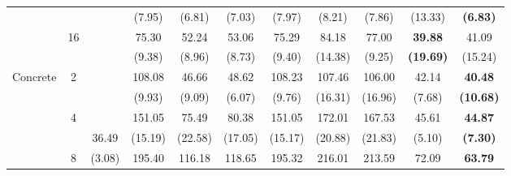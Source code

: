 \documentclass[letterpaper]{article} %
\begin{document}
\begin{table}[!t]
{\begin{tabular}{clcccccccc|cc}
\multicolumn{2}{c}{}                             &                       &                             & (7.95)                    & (6.81)                    & (7.03)                      & (7.97)                    & (8.21)                    & (7.86)                      & (13.33)             & \textbf{(6.83)}       \\
\multicolumn{2}{c}{}                             & \multirow{2}{*}{16}   &                             & 75.30                     & 52.24                     & 53.06                       & 75.29                     & 84.18                     & 77.00                       & \textbf{39.88}      & 41.09                 \\
\multicolumn{2}{c}{}                             &                       &                             & (9.38)                    & (8.96)                    & (8.73)                      & (9.40)                    & (14.38)                   & (9.25)                      & \textbf{(19.69)}    & (15.24)               \\ \hline
\multicolumn{2}{c}{\multirow{8}{*}{Concrete}}    & \multirow{2}{*}{2}    &                             & 108.08                    & 46.66                     & 48.62                       & 108.23                    & 107.46                    & 106.00                      & 42.14               & \textbf{40.48}        \\
\multicolumn{2}{c}{}                             &                       &                             & (9.93)                    & (9.09)                    & (6.07)                      & (9.76)                    & (16.31)                   & (16.96)                     & (7.68)              & \textbf{(10.68)}      \\
\multicolumn{2}{c}{}                             & \multirow{2}{*}{4}    &                             & 151.05                    & 75.49                     & 80.38                       & 151.05                    & 172.01                    & 167.53                      & 45.61               & \textbf{44.87}        \\
\multicolumn{2}{c}{}                             &                       & 36.49                       & (15.19)                   & (22.58)                   & (17.05)                     & (15.17)                   & (20.88)                   & (21.83)                     & (5.10)              & \textbf{(7.30)}       \\
\multicolumn{2}{c}{}                             & \multirow{2}{*}{8}    & (3.08)                      & 195.40                    & 116.18                    & 118.65                      & 195.32                    & 216.01                    & 213.59                      & 72.09               & \textbf{63.79}        \\

\end{tabular}}
\end{table}
\end{document}
